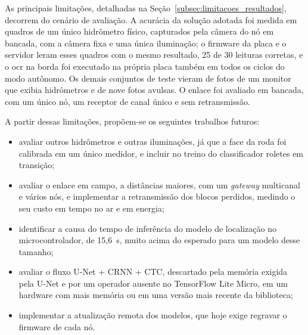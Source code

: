 As principais limitações, detalhadas na Seção~\ref{subsec:limitacoes_resultados}, decorrem
do cenário de avaliação. A acurácia da solução adotada foi medida em quadros de um único
hidrômetro físico, capturados pela câmera do nó em bancada, com a câmera fixa e uma única
iluminação; o firmware da placa e o servidor leram esses
quadros com o mesmo resultado, 25 de 30 leituras corretas, e o \gls{ocr} na borda foi executado na
própria placa também em todos os ciclos do modo autônomo. Os demais conjuntos de teste vieram de fotos de um monitor que exibia hidrômetros
e de nove fotos avulsas. O enlace foi avaliado em bancada, com um único nó, um receptor de
canal único e sem retransmissão.

A partir dessas limitações, propõem-se os seguintes trabalhos futuros:

\begin{itemize}
    \item avaliar outros hidrômetros e outras iluminações, já que a face da roda foi
    calibrada em um único medidor, e incluir no treino do classificador roletes em transição;
    \item avaliar o enlace em campo, a distâncias maiores, com um \textit{gateway}
    multicanal e vários nós, e implementar a retransmissão dos blocos perdidos, medindo o
    seu custo em tempo no ar e em energia;
    \item identificar a causa do tempo de inferência do modelo de localização no
    microcontrolador, de 15,6~s, muito acima do esperado para um modelo desse tamanho;
    \item avaliar o fluxo U-Net + CRNN + CTC, descartado pela memória exigida pela U-Net e
    por um operador ausente no TensorFlow Lite Micro, em um hardware com mais memória ou em
    uma versão mais recente da biblioteca;
    \item implementar a atualização remota dos modelos, que hoje exige regravar o firmware
    de cada nó.
\end{itemize}
